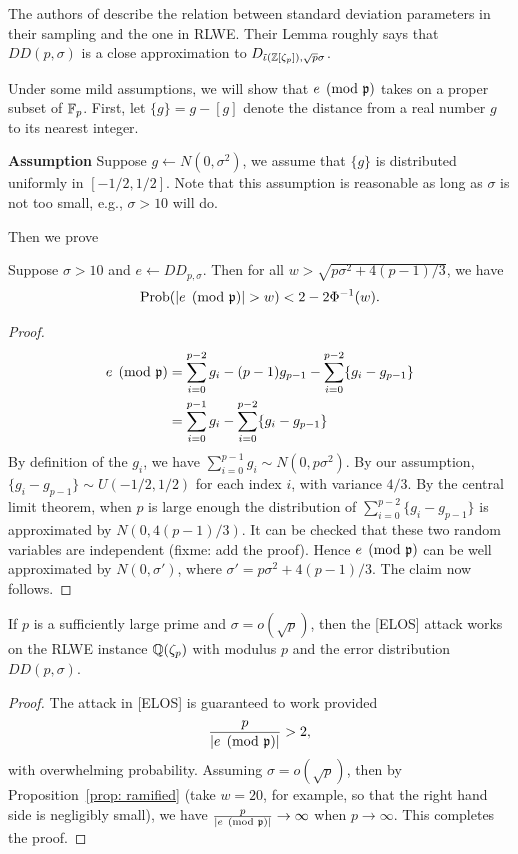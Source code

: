 \documentclass{amsart}
\begin{document}
The authors of \cite{ducas2012ring} describe the relation between standard deviation parameters in their sampling and the one in RLWE. Their Lemma roughly says that $DD(p, \sigma)$ is a close approximation to $D_{\tilde{\iota}(\mathbb{Z}[\zeta_p]),\sqrt{p}\sigma}$.

Under some mild assumptions, we will show that $e \pmod {\mathfrak{p}}$ takes on a proper subset of $\mathbb{F}_p$.
First, let $\{g\} =  g - [g]$ denote the distance from a real number $g$ to its nearest integer.

{\bf Assumption} Suppose $g \gets N(0,\sigma^2)$, we assume that $\{g\}$ is distributed uniformly in $[-1/2,1/2]$. Note that this assumption is reasonable as long as $\sigma$ is not too small, e.g., $\sigma >10$ will do.

Then we prove
\begin{Prop} \label{prop: ramified}
Suppose $\sigma > 10$ and $e \gets DD_{p, \sigma}$. Then for all $w > \sqrt{p\sigma^2 + 4(p-1)/3}$, we have
\[
    \operatorname{Prob}(|e\pmod{\mathfrak{p}}| > w) < 2 - 2\Phi^{-1}(w).
\]
\end{Prop}

\begin{proof}
\begin{align*}
e \pmod {\mathfrak{p}} &= \sum_{i=0}^{p-2} g_i - (p-1)g_{p-1} - \sum_{i=0}^{p-2} \{g_i - g_{p-1}\} \\
& = \sum_{i=0}^{p-1} g_i - \sum_{i=0}^{p-2} \{g_i - g_{p-1}\}
\end{align*}
By definition of the $g_i$, we have $\sum_{i=0}^{p-1} g_i \sim N(0, p\sigma^2)$. By our assumption, $\{g_i - g_{p-1}\} \sim U(-1/2,1/2)$ for each index $i$, with variance $4/3$. By the central limit theorem, when $p$ is large enough the distribution of $\sum_{i=0}^{p-2} \{g_i - g_{p-1}\}$ is approximated by $N(0, 4(p-1)/3)$. It can be checked that these two random variables are independent (fixme: add the proof). Hence $e \pmod{\mathfrak{p}}$ can be well approximated by $N(0, \sigma')$, where $\sigma' = p\sigma^2 + 4(p-1)/3$. The claim now follows.
\end{proof}

\begin{Corollary}
If $p$ is a sufficiently large prime and $\sigma = o(\sqrt{p})$, then the [ELOS] attack works on the RLWE instance $\mathbb{Q}(\zeta_p)$ with modulus $p$ and the error distribution $DD(p, \sigma)$.
\end{Corollary}

\begin{proof}
The attack in [ELOS] is guaranteed to work provided
\[
    \frac{p}{|e \pmod{\mathfrak{p}}|} > 2,
\]
with overwhelming probability.
Assuming $\sigma = o(\sqrt{p})$, then by Proposition~\ref{prop: ramified} (take $w = 20$, for example, so that the right hand side is negligibly small), we have $\frac{p}{|e \pmod{\mathfrak{p}}|} \to \infty$ when $p \to \infty$. This completes the proof.
\end{proof}
\end{document}
